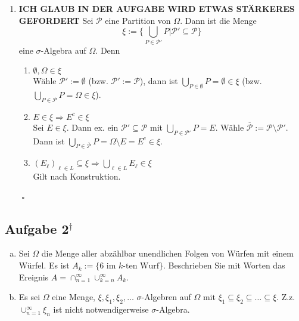 \documentclass[11pt,a4paper,ngerman]{article}
\newcommand{\set}[1]{ \{ #1 \}}
\begin{document}
\begin{enumerate}[a)]
\begin{enumerate}[(1)]
\item \textbf{ICH GLAUB IN DER AUFGABE WIRD ETWAS STÄRKERES GEFORDERT}
Sei $\mathcal{P}$ eine Partition von $\Omega$. Dann ist die Menge
\begin{equation*}\xi := \{ \bigcup_{P \in \mathcal{P'}} P | \mathcal{P'} \subseteq \mathcal{P} \} \end{equation*}
eine $\sigma$-Algebra auf $\Omega$. Denn

\begin{enumerate}[(1)]
\item $\emptyset, \Omega \in \xi$ \\
Wähle $\mathcal{P'} := \emptyset$ (bzw. $\mathcal{P'} := \mathcal{P}$), dann ist $\bigcup_{P \in \emptyset} P = \emptyset \in \xi$ (bzw. $\bigcup_{P \in \mathcal{P}} P = \Omega \in \xi$).

\item $E \in \xi \Rightarrow E^c \in \xi$ \\
Sei $E \in \xi$. Dann ex. ein $\mathcal{P'} \subseteq \mathcal{P}$ mit $\bigcup_{P \in \mathcal{P'}} P = E$. Wähle $\overline{\mathcal{P}} := \mathcal{P} \setminus \mathcal{P'}$.\\
Dann ist $\bigcup_{P \in \overline{\mathcal{P}}} P = \Omega \setminus E = E^c \in \xi$.

\item $\left( E_\ell \right)_{\ell \in L} \subseteq \xi \Rightarrow \bigcup_{\ell \in L} E_\ell \in \xi$ \\
Gilt nach Konstruktion.
\end{enumerate}
 $\mbox{}$ \hfill $\square$
\end{enumerate}
\end{enumerate}



\subsection*{Aufgabe 2$^\dagger$}
\begin{enumerate}[a)]
\item Sei $\Omega$ die Menge aller abzählbar unendlichen Folgen von Würfen mit einem Würfel. Es ist $A_k := \set{\text{6 im $k$-ten Wurf}}$. Beschrieben
Sie mit Worten das Ereignis $A = \cap_{n=1}^\infty \cup_{k=n}^\infty A_k$.

\item Es sei $\Omega$ eine Menge, $\xi, \xi_1, \xi_2,\ldots$ $\sigma$-Algebren auf $\Omega$ mit $\xi_1 \subseteq \xi_2 \subseteq \ldots \subseteq \xi$.
Z.z. $\cup_{n=1}^\infty \xi_n$ ist nicht notwendigerweise $\sigma$-Algebra.
\end{enumerate}
\end{document}
